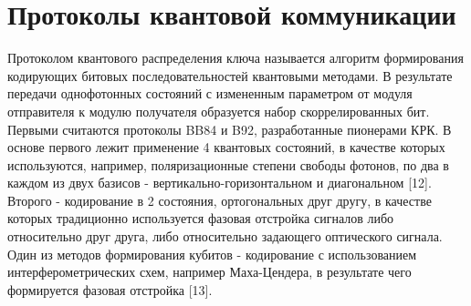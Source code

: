 
\section{Протоколы квантовой коммуникации} \label{sec:ch1/sec3}

Протоколом квантового распределения ключа называется алгоритм формирования кодирующих битовых последовательностей квантовыми методами. В результате передачи однофотонных состояний с измененным параметром от модуля отправителя к модулю получателя образуется набор скоррелированных бит. Первыми считаются протоколы BB84 и B92, разработанные пионерами КРК. В основе первого лежит применение 4 квантовых состояний, в качестве которых используются, например, поляризационные степени свободы фотонов, по два в каждом из двух базисов - вертикально-горизонтальном и диагональном [12]. Второго - кодирование в 2 состояния, ортогональных друг другу, в качестве которых традиционно используется фазовая отстройка сигналов либо относительно друг друга, либо относительно задающего оптического сигнала. Один из методов формирования кубитов -  кодирование с использованием интерферометрических схем, например Маха-Цендера, в результате чего формируется фазовая отстройка [13]. 

